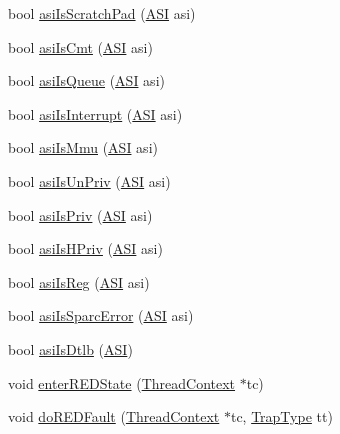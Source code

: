 \begin{DoxyCompactItemize}
\item 
bool \hyperlink{namespaceSparcISA_adee3e63d7c8a89574a10d0da306c1be1}{asiIsScratchPad} (\hyperlink{namespaceSparcISA_a6dd43f1311515252b283f56d7095a1f3}{ASI} asi)
\item 
bool \hyperlink{namespaceSparcISA_a9531fb3db93ff00372571a055d094ddc}{asiIsCmt} (\hyperlink{namespaceSparcISA_a6dd43f1311515252b283f56d7095a1f3}{ASI} asi)
\item 
bool \hyperlink{namespaceSparcISA_a5360b39b7131894da3d9678add217ad9}{asiIsQueue} (\hyperlink{namespaceSparcISA_a6dd43f1311515252b283f56d7095a1f3}{ASI} asi)
\item 
bool \hyperlink{namespaceSparcISA_a9ae7d061a2e4abcab3fbc6240ff2dbe5}{asiIsInterrupt} (\hyperlink{namespaceSparcISA_a6dd43f1311515252b283f56d7095a1f3}{ASI} asi)
\item 
bool \hyperlink{namespaceSparcISA_a89468421f86725b3dabc030976d7d66a}{asiIsMmu} (\hyperlink{namespaceSparcISA_a6dd43f1311515252b283f56d7095a1f3}{ASI} asi)
\item 
bool \hyperlink{namespaceSparcISA_a36fc5916dec11c97ac8e2c55a2faec03}{asiIsUnPriv} (\hyperlink{namespaceSparcISA_a6dd43f1311515252b283f56d7095a1f3}{ASI} asi)
\item 
bool \hyperlink{namespaceSparcISA_a3a9876c54c59d03a54683c9c9f0215a0}{asiIsPriv} (\hyperlink{namespaceSparcISA_a6dd43f1311515252b283f56d7095a1f3}{ASI} asi)
\item 
bool \hyperlink{namespaceSparcISA_a555f3112a89b6856275a44365d2ebd26}{asiIsHPriv} (\hyperlink{namespaceSparcISA_a6dd43f1311515252b283f56d7095a1f3}{ASI} asi)
\item 
bool \hyperlink{namespaceSparcISA_af33254f1d08f51f2f8a81902c1c4cc53}{asiIsReg} (\hyperlink{namespaceSparcISA_a6dd43f1311515252b283f56d7095a1f3}{ASI} asi)
\item 
bool \hyperlink{namespaceSparcISA_ae656441d838f9206db0f8c80b0fea60c}{asiIsSparcError} (\hyperlink{namespaceSparcISA_a6dd43f1311515252b283f56d7095a1f3}{ASI} asi)
\item 
bool \hyperlink{namespaceSparcISA_aa61b381f75bd65d8c8599a40c59c828a}{asiIsDtlb} (\hyperlink{namespaceSparcISA_a6dd43f1311515252b283f56d7095a1f3}{ASI})
\item 
void \hyperlink{namespaceSparcISA_af886d65b7669284f33784702caa9bddc}{enterREDState} (\hyperlink{classThreadContext}{ThreadContext} $\ast$tc)
\item 
void \hyperlink{namespaceSparcISA_a0a06026b205d00709c2f34b018fc1dfd}{doREDFault} (\hyperlink{classThreadContext}{ThreadContext} $\ast$tc, \hyperlink{namespaceSparcISA_aabeb6cc11127ef5b6ebc776bfc5fb95b}{TrapType} tt)

\end{DoxyCompactItemize}
